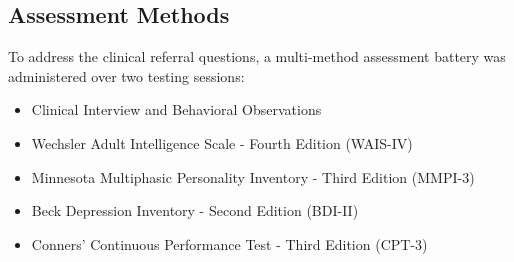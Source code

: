 \subsection{Assessment Methods}
To address the clinical referral questions, a multi-method assessment battery was administered over two testing sessions:
\begin{itemize}
    \item Clinical Interview and Behavioral Observations
    \item Wechsler Adult Intelligence Scale - Fourth Edition (WAIS-IV)~\cite{wechsler2008wais4}
    \item Minnesota Multiphasic Personality Inventory - Third Edition (MMPI-3)~\cite{benporath2020mmpi3}
    \item Beck Depression Inventory - Second Edition (BDI-II)~\cite{beck1996bdiii}
    \item Conners' Continuous Performance Test - Third Edition (CPT-3)~\cite{conners2014cpt3}
\end{itemize}
